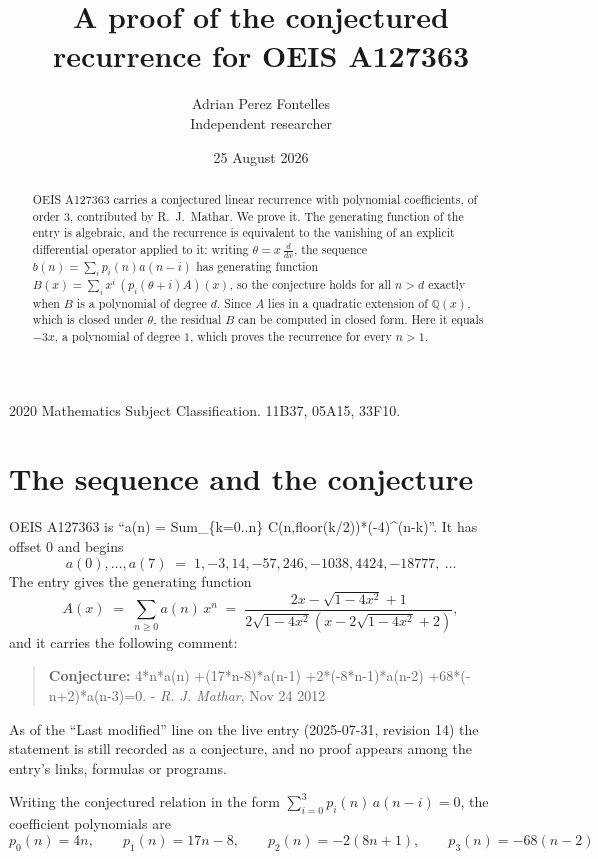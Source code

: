 \documentclass[11pt,a4paper]{article}
\title{A proof of the conjectured recurrence for OEIS A127363}
\author{Adrian Perez Fontelles\\ \small Independent researcher}
\date{25 August 2026}
\theoremstyle{plain}
\theoremstyle{definition}
\begin{document}
\maketitle

\begin{abstract}
OEIS A127363 carries a conjectured linear recurrence with polynomial coefficients, of
order 3, contributed by R.~J.~Mathar. We prove it. The generating function of the
entry is algebraic, and the recurrence is equivalent to the vanishing of an explicit
differential operator applied to it: writing $\theta=x\,\frac{d}{dx}$, the sequence
$b(n)=\sum_{i}p_{i}(n)a(n-i)$ has generating function
$B(x)=\sum_{i}x^{i}\,(p_{i}(\theta+i)A)(x)$, so the conjecture holds for all $n>d$ exactly
when $B$ is a polynomial of degree $d$. Since $A$ lies in a quadratic extension of
$\mathbb{Q}(x)$, which is closed under $\theta$, the residual $B$ can be computed in
closed form. Here it equals $- 3 x$, a polynomial of degree $1$, which proves
the recurrence for every $n>1$.
\end{abstract}

\noindent\small 2020 Mathematics Subject Classification. 11B37, 05A15, 33F10.\normalsize

\section{The sequence and the conjecture}

OEIS A127363 is ``a(n) = Sum\_\{k=0..n\} C(n,floor(k/2))*(-4)\^{}(n-k)''. It has offset $0$ and begins
\[
a(0),\dots,a(7)\;=\;1, -3, 14, -57, 246, -1038, 4424, -18777,\ \dots
\]
The entry gives the generating function
\begin{equation}\label{eq:gf}
A(x)\;=\;\sum_{n\ge 0} a(n)\,x^{n}\;=\;\frac{2 x - \sqrt{1 - 4 x^{2}} + 1}{2 \sqrt{1 - 4 x^{2}} \left(x - 2 \sqrt{1 - 4 x^{2}} + 2\right)} ,
\end{equation}
and it carries the following comment:
\begin{quote}\small
\textbf{Conjecture:} 4*n*a(n) +(17*n-8)*a(n-1) +2*(-8*n-1)*a(n-2) +68*(-n+2)*a(n-3)=0. - \emph{R. J. Mathar}, Nov 24 2012
\end{quote}
As of the ``Last modified'' line on the live entry (2025-07-31, revision 14) the
statement is still recorded as a conjecture, and no proof appears among the entry's links,
formulas or programs.

Writing the conjectured relation in the form $\sum_{i=0}^{3}p_{i}(n)\,a(n-i)=0$,
the coefficient polynomials are
\[
p_{0}(n)=4 n,\qquad p_{1}(n)=17 n - 8,\qquad p_{2}(n)=- 2 \left(8 n + 1\right),\qquad p_{3}(n)=- 68 \left(n - 2\right)
\]
\end{document}
